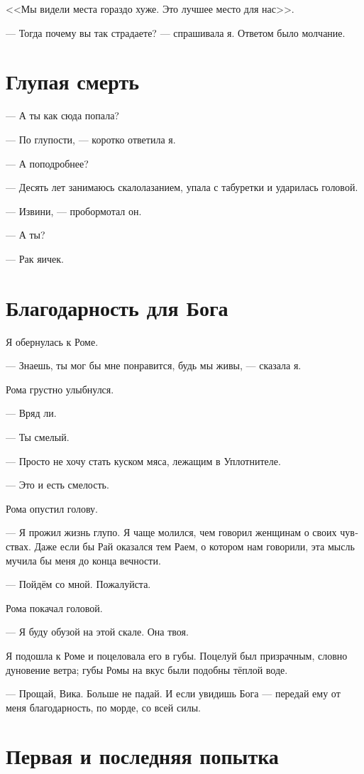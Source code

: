 \documentclass[a4paper,12pt,fleqn]{book}\usepackage{polyglossia}\setdefaultlanguage[babelshorthands=true]{russian}\setotherlanguage{english}\defaultfontfeatures{Ligatures=TeX,Mapping=tex-text}\usepackage{xcolor}\newcommand{\ml}[3]{#2}
\begin{document}
<<Мы видели места гораздо хуже.
Это лучшее место для нас>>.

--- Тогда почему вы так страдаете? --- спрашивала я.
Ответом было молчание.

\section{Глупая смерть}

--- А ты как сюда попала?

--- По глупости, --- коротко ответила я.

--- А поподробнее?

--- Десять лет занимаюсь скалолазанием, упала с табуретки и ударилась головой.

--- Извини, --- пробормотал он.

--- А ты?

--- Рак яичек.

\section{Благодарность для Бога}

Я обернулась к Роме.

--- Знаешь, ты мог бы мне понравится, будь мы живы, --- сказала я.

Рома грустно улыбнулся.

--- Вряд ли.

--- Ты смелый.

--- Просто не хочу стать куском мяса, лежащим в Уплотнителе.

--- Это и есть смелость.

Рома опустил голову.

--- Я прожил жизнь глупо.
Я чаще молился, чем говорил женщинам о своих чувствах.
Даже если бы Рай оказался тем Раем, о котором нам говорили, эта мысль мучила бы меня до конца вечности.

--- Пойдём со мной.
Пожалуйста.

Рома покачал головой.

--- Я буду обузой на этой скале.
Она твоя.

Я подошла к Роме и поцеловала его в губы.
Поцелуй был призрачным, словно дуновение ветра;
губы Ромы на вкус были подобны тёплой воде.

--- Прощай, Вика.
Больше не падай.
И если увидишь Бога --- передай ему от меня благодарность, по морде, со всей силы.

\section{Первая и последняя попытка}
\end{document}

